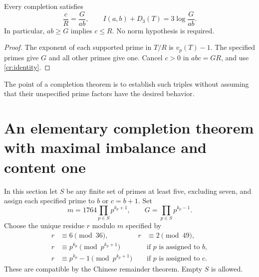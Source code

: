 \begin{lemma}\label{cr:compensation}
Every completion satisfies
\[
 \frac cR=\frac G{ab},\qquad
 I(a,b)+D_3(T)=3\log\frac G{ab}.
\]
In particular, $ab\ge G$ implies $c\le R$. No norm hypothesis is required.
\end{lemma}
\begin{proof}
The exponent of each supported prime in $T/R$ is $v_p(T)-1$. The specified
primes give $G$ and all other primes give one. Cancel $c>0$ in $abc=GR$,
and use \eqref{cr:identity}.
\end{proof}
The point of a completion theorem is to establish such triples without
assuming that their unspecified prime factors have the desired behavior.

\section{An elementary completion theorem with maximal imbalance and content one}
\label{cr:elementary}
In this section let $S$ be any finite set of primes at least five, excluding
seven, and assign each specified prime to $b$ or $c=b+1$. Set
\[
 m=1764\prod_{p\in S}p^{k_p+1},\qquad G=\prod_{p\in S}p^{k_p-1}.
\]
Choose the unique residue $r$ modulo $m$ specified by
\begin{align*}
 r&\equiv6\pmod{36},&r&\equiv2\pmod{49},\\
 r&\equiv p^{k_p}\pmod{p^{k_p+1}}&&\text{if $p$ is assigned to $b$},\\
 r&\equiv p^{k_p}-1\pmod{p^{k_p+1}}&&\text{if $p$ is assigned to $c$}.
\end{align*}
These are compatible by the Chinese remainder theorem. Empty $S$ is allowed.


